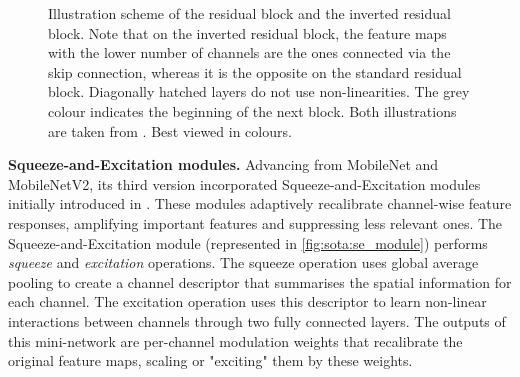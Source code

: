 \begin{figure}[htbp]
  \centering
  \caption{Illustration scheme of the residual block and the inverted residual
  block. Note that on the inverted residual block, the feature maps with the
  lower number of channels are the ones connected via the skip connection,
  whereas it is the opposite on the standard residual block. Diagonally hatched
  layers do not use non-linearities. The grey colour indicates the beginning of
  the next block. Both illustrations are taken from \cite{DongMobileNetV2}. Best
  viewed in colours.}
  \label{fig:sota:inverted_vs_residual_blocks}
\end{figure}


\noindent\textbf{Squeeze-and-Excitation modules.} Advancing from MobileNet and
MobileNetV2, its third version \cite{DBLP:conf/iccv/HowardPALSCWCTC19}
incorporated Squeeze-and-Excitation modules initially introduced in
\cite{DBLP:conf/cvpr/HuSS18}. These modules adaptively recalibrate channel-wise
feature responses, amplifying important features and suppressing less relevant
ones. The Squeeze-and-Excitation module (represented in
\cref{fig:sota:se_module}) performs \emph{squeeze} and \emph{excitation}
operations. The squeeze operation uses global average pooling to create a
channel descriptor that summarises the spatial information for each channel. The
excitation operation uses this descriptor to learn non-linear interactions
between channels through two fully connected layers. The outputs of this
mini-network are per-channel modulation weights that recalibrate the original
feature maps, scaling or "exciting" them by these weights.\\

